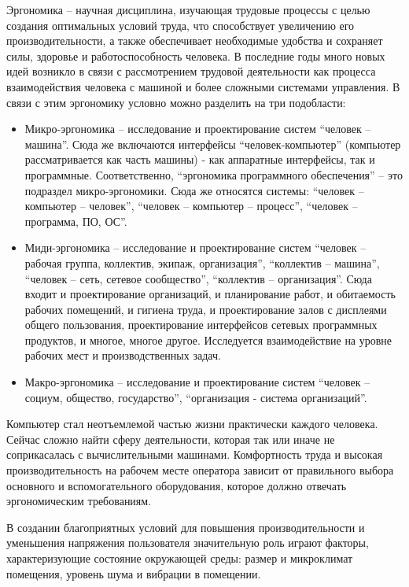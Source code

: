 \documentclass[12pt,a4paper]{report}
\begin{document}
Эргономика – научная дисциплина, изучающая трудовые процессы с целью создания оптимальных условий труда, что способствует увеличению его производительности, а также обеспечивает необходимые удобства и сохраняет силы, здоровье и работоспособность человека. В последние годы много новых идей возникло в связи с рассмотрением трудовой деятельности как процесса взаимодействия человека с машиной и более сложными системами управления. В связи с этим эргономику условно можно разделить на три подобласти: 
\begin{itemize}
\item Микро-эргономика – исследование и проектирование систем “человек – машина”. Сюда же включаются интерфейсы “человек-компьютер” (компьютер  рассматривается как часть машины) - как аппаратные интерфейсы, так и программные. Соответственно, “эргономика программного обеспечения” – это подраздел микро-эргономики. Сюда же относятся системы: “человек – компьютер – человек”, “человек – компьютер – процесс”, “человек – программа, ПО, ОС”.
\item Миди-эргономика – исследование и проектирование систем “человек – рабочая группа, коллектив, экипаж, организация”, “коллектив – машина”, “человек – сеть, сетевое сообщество”, “коллектив – организация”. Сюда входит и проектирование организаций, и планирование работ, и обитаемость рабочих помещений, и гигиена труда, и проектирование залов с дисплеями общего пользования, проектирование интерфейсов сетевых программных продуктов, и многое, многое другое. Исследуется взаимодействие на уровне рабочих мест и производственных задач.
\item Макро-эргономика – исследование и проектирование систем “человек – социум, общество, государство”, “организация - система организаций”.
\end{itemize}

Компьютер стал неотъемлемой частью жизни практически каждого человека. Сейчас сложно найти сферу деятельности, которая так или иначе не соприкасалась с вычислительными машинами. Комфортность труда и высокая производительность на рабочем месте оператора зависит от правильного выбора основного и вспомогательного оборудования, которое должно отвечать эргономическим требованиям. 

В создании благоприятных условий для повышения  производительности и уменьшения напряжения пользователя значительную роль играют факторы, характеризующие состояние окружающей  среды: размер и микроклимат помещения, уровень шума и вибрации в помещении.
\end{document}
